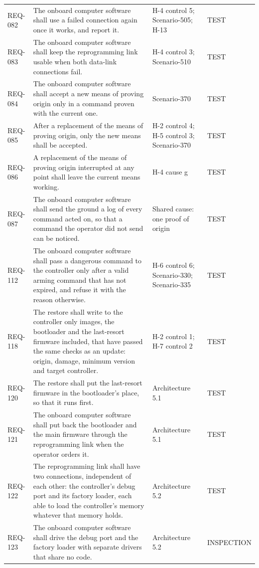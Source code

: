 \documentclass[11pt,a4paper]{article}
\begin{document}
{\begin{xltabular}{\textwidth}{@{}l>{\raggedright\arraybackslash}X>{\raggedright\arraybackslash}p{3.2cm}>{\raggedright\arraybackslash}p{3.0cm}@{}}
REQ-082 & The onboard computer software shall use a failed connection again once it works, and report it. & H-4 control 5; Scenario-505; H-13 & TEST \\
REQ-083 & The onboard computer software shall keep the reprogramming link usable when both data-link connections fail. & H-4 control 3; Scenario-510 & TEST \\
REQ-084 & The onboard computer software shall accept a new means of proving origin only in a command proven with the current one. & Scenario-370 & TEST \\
REQ-085 & After a replacement of the means of proving origin, only the new means shall be accepted. & H-2 control 4; H-5 control 3; Scenario-370 & TEST \\
REQ-086 & A replacement of the means of proving origin interrupted at any point shall leave the current means working. & H-4 cause g & TEST \\
REQ-087 & The onboard computer software shall send the ground a log of every command acted on, so that a command the operator did not send can be noticed. & Shared cause: one proof of origin & TEST \\
REQ-112 & The onboard computer software shall pass a dangerous command to the controller only after a valid arming command that has not expired, and refuse it with the reason otherwise. & H-6 control 6; Scenario-330; Scenario-335 & TEST \\
REQ-118 & The restore shall write to the controller only images, the bootloader and the last-resort firmware included, that have passed the same checks as an update: origin, damage, minimum version and target controller. & H-2 control 1; H-7 control 2 & TEST \\
REQ-120 & The restore shall put the last-resort firmware in the bootloader's place, so that it runs first. & Architecture 5.1 & TEST \\
REQ-121 & The onboard computer software shall put back the bootloader and the main firmware through the reprogramming link when the operator orders it. & Architecture 5.1 & TEST \\
REQ-122 & The reprogramming link shall have two connections, independent of each other: the controller's debug port and its factory loader, each able to load the controller's memory whatever that memory holds. & Architecture 5.2 & TEST \\
REQ-123 & The onboard computer software shall drive the debug port and the factory loader with separate drivers that share no code. & Architecture 5.2 & INSPECTION \\

\end{xltabular}}
\end{document}
